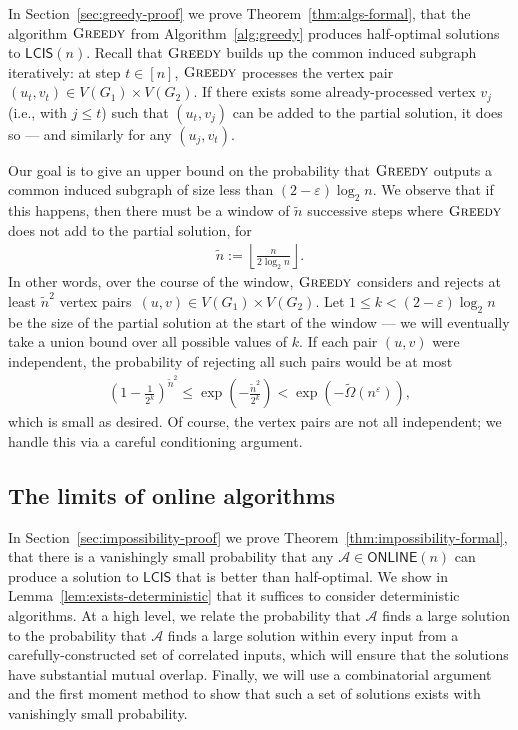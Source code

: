 \documentclass[11pt]{article}
\theoremstyle{plain}
\theoremstyle{definition}
\theoremstyle{remark}
\newcommand{\greedy}{\textsc{Greedy} }
\newcommand{\eps}{\varepsilon}
\newcommand{\MCS}{\mathsf{LCIS}}
\newcommand{\Alg}{\mathcal{A}}
\newcommand{\online}{\mathsf{ONLINE}}
\begin{document}
In Section~\ref{sec:greedy-proof} we prove Theorem~\ref{thm:algs-formal}, that the algorithm $\greedy$ from Algorithm~\ref{alg:greedy} produces half-optimal solutions to $\MCS(n)$. Recall that $\greedy$ builds up the common induced subgraph iteratively: at step $t \in [n]$, $\greedy$ processes the vertex pair $(u_t, v_t) \in V(G_1) \times V(G_2)$. If there exists some already-processed vertex $v_j$ (i.e., with $j \leq t$) such that $(u_t, v_j)$ can be added to the partial solution, it does so --- and similarly for any $(u_j, v_t)$. 

Our goal is to give an upper bound on the probability that $\greedy$ outputs a common induced subgraph of size less than $(2 - \eps)\log_2 n$. We observe that if this happens, then there must be a window of $\widetilde{n}$ successive steps where $\greedy$ does not add to the partial solution, for
\begin{align*}
    \widetilde{n} := \left\lfloor \frac{n}{2\log_2 n} \right\rfloor.
\end{align*}
In other words, over the course of the window, $\greedy$ considers and rejects at least $\widetilde{n}^2$ vertex pairs~$(u, v) \in V(G_{1}) \times V(G_{2})$. Let $1 \leq k < (2-\eps) \log_2 n$ be the size of the partial solution at the start of the window --- we will eventually take a union bound over all possible values of $k$. If each pair $(u,v)$ were independent, the probability of rejecting all such pairs would be at most
\begin{align*}
    \left(1 - \frac{1}{2^k}\right)^{\widetilde{n}^2} \leq \exp \left( - \frac{\widetilde{n}^2}{2^k}\right) < \exp(-\widetilde{\Omega}(n^\eps)),
\end{align*}
which is small as desired. 
Of course, the vertex pairs are not all independent; we handle this via a careful conditioning argument. 


\subsection{The limits of online algorithms}\label{sec:impossibility-ideas}

In Section~\ref{sec:impossibility-proof} we prove Theorem~\ref{thm:impossibility-formal}, that there is a vanishingly small probability that any $\Alg \in \online(n)$ can produce a solution to $\MCS$ that is better than half-optimal. We show in Lemma~\ref{lem:exists-deterministic} that it suffices to consider deterministic algorithms. At a high level, we relate the probability that $\Alg$ finds a large solution to the probability that $\Alg$ finds a large solution within every input from a carefully-constructed set of correlated inputs, which will ensure that the solutions have substantial mutual overlap. Finally, we will use a combinatorial argument and the first moment method to show that such a set of solutions exists with vanishingly small probability.
\end{document}
